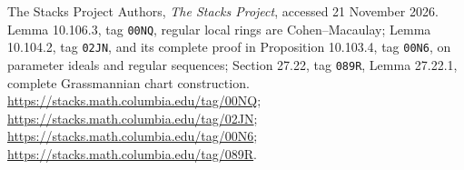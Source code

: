 The Stacks Project Authors,
\emph{The Stacks Project}, accessed 21 November 2026.
Lemma 10.106.3, tag \texttt{00NQ}, regular local rings are Cohen--Macaulay;
Lemma 10.104.2, tag \texttt{02JN}, and its complete proof in
Proposition 10.103.4, tag \texttt{00N6}, on parameter ideals and regular
sequences; Section 27.22, tag \texttt{089R}, Lemma 27.22.1, complete Grassmannian
chart construction.
\url{https://stacks.math.columbia.edu/tag/00NQ};
\url{https://stacks.math.columbia.edu/tag/02JN};
\url{https://stacks.math.columbia.edu/tag/00N6};
\url{https://stacks.math.columbia.edu/tag/089R}.

